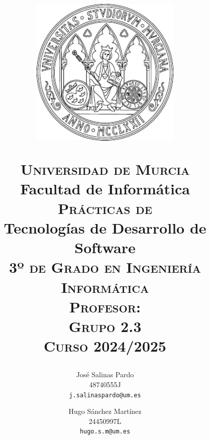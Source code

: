 \documentclass[11pt]{article}
\begin{document}
\title{
	\vspace{-5ex}
	\begin{figure}[H]
		\centering
		\includegraphics[width=72mm]{umu-logo.pdf}
	\end{figure}
	
	{\Large \textsc{Universidad de Murcia}}\\
	{\Large Facultad de Informática}\\ [12.5ex]
	{\Large \textsc{Prácticas de}\\ [1ex]}
	{\Huge Tecnologías de Desarrollo de Software}\\ [1ex]
	{\Large \textsc{3º de Grado en Ingeniería Informática}}\\
	{\Large \textsc{Profesor: }} \\
	{\Large \textsc{Grupo 2.3}} \\
	{\Large \textsc{Curso 2024/2025}} \\ 
	\vspace{10ex}
}

\author{
	{\Large José Salinas Pardo}\\[0.5ex]
	48740555J\\
	\texttt{j.salinaspardo@um.es}
	\and
	{\Large Hugo Sánchez Martínez}\\[0.5ex]
	24450997L\\
	\texttt{hugo.s.m@um.es}\\
}

\pagestyle{fancy}
\fancyhf{}
\fancyhead[LE]{\nouppercase{\rightmark} \hfill \textbf{\nouppercase{\leftmark}}}   %
\fancyhead[RO]{\nouppercase{\rightmark}}  %
\setlength{\headheight}{25pt}  %
\fancyfoot[C]{\thepage}

\date{\vspace{-10ex}}
\maketitle
\thispagestyle{empty} %
\clearpage
\end{document}
